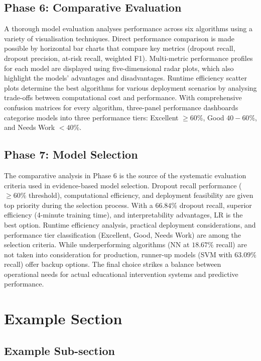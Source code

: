 \documentclass[ %
                    author={Carlos Duran Calle},
                supervisor={Dr. Felipe Campelo},
                    degree={MSc},
                     title={Comparative Machine Learning Analysis for Student Dropout Prediction in a Virtual Learning Environment},
                  subtitle={Incorporating Student Engagement and Socio-Economic Features},
                      type={},
                      year={2025}]{dissertation}
\begin{document}
\subsection{Phase 6: Comparative Evaluation}
A thorough model evaluation analyses performance across six algorithms using a variety of visualisation techniques. Direct performance comparison is made possible by horizontal bar charts that compare key metrics (dropout recall, dropout precision, at-risk recall, weighted F1). Multi-metric performance profiles for each model are displayed using five-dimensional radar plots, which also highlight the models' advantages and disadvantages. Runtime efficiency scatter plots determine the best algorithms for various deployment scenarios by analysing trade-offs between computational cost and performance. With comprehensive confusion matrices for every algorithm, three-panel performance dashboards categorise models into three performance tiers: Excellent $\geq60\%$, Good $40-60\%$, and Needs Work $<40\%$.

\subsection{Phase 7: Model Selection}
The comparative analysis in Phase 6 is the source of the systematic evaluation criteria used in evidence-based model selection. Dropout recall performance ($\geq60\%$ threshold), computational efficiency, and deployment feasibility are given top priority during the selection process. With a $66.84\%$ dropout recall, superior efficiency (4-minute training time), and interpretability advantages, LR is the best option. Runtime efficiency analysis, practical deployment considerations, and performance tier classification (Excellent, Good, Needs Work) are among the selection criteria. While underperforming algorithms (NN at $18.67\%$ recall) are not taken into consideration for production, runner-up models (SVM with $63.09\%$ recall) offer backup options. The final choice strikes a balance between operational needs for actual educational intervention systems and predictive performance.

\section{Example Section}

\subsection{Example Sub-section}
\end{document}
